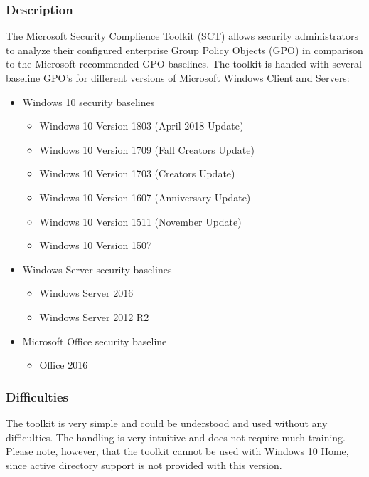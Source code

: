 \subsubsection{Description}
The Microsoft Security Complience Toolkit (SCT) \cite{SCT} allows security administrators to analyze their configured enterprise Group Policy Objects (GPO) in comparison to the Microsoft-recommended GPO baselines. The toolkit is handed with several baseline GPO's for different versions of Microsoft Windows Client and Servers:

\begin{itemize}
    \item Windows 10 security baselines
    \begin{itemize}
        \item Windows 10 Version 1803 (April 2018 Update)
        \item Windows 10 Version 1709 (Fall Creators Update)
        \item Windows 10 Version 1703 (Creators Update)
        \item Windows 10 Version 1607 (Anniversary Update)
        \item Windows 10 Version 1511 (November Update)
        \item Windows 10 Version 1507
    \end{itemize}
    \item Windows Server security baselines
    \begin{itemize}
        \item Windows Server 2016
        \item Windows Server 2012 R2
    \end{itemize}
    \item Microsoft Office security baseline
    \begin{itemize}
        \item Office 2016
    \end{itemize}
\end{itemize}

\subsubsection{Difficulties}
The toolkit is very simple and could be understood and used without any difficulties. The handling is very intuitive and does not require much training. Please note, however, that the toolkit cannot be used with Windows 10 Home, since active directory support is not provided with this version.

